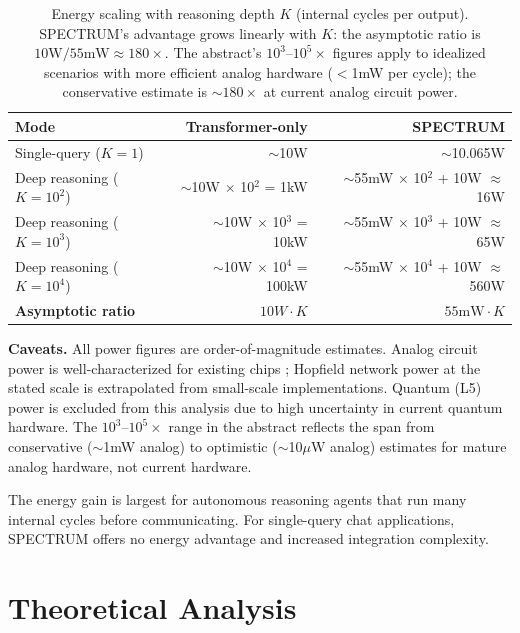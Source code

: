 \documentclass[12pt]{article}
\begin{document}
\begin{table}[H]
\centering
\small
\begin{tabular}{lrr}
\toprule
\textbf{Mode} & \textbf{Transformer-only} & \textbf{SPECTRUM} \\
\midrule
Single-query ($K=1$)     & $\sim$10W & $\sim$10.065W \\
Deep reasoning ($K=10^2$)  & $\sim$10W $\times$ 10$^2$ = 1kW & $\sim$55mW $\times$ 10$^2$ + 10W $\approx$ 16W \\
Deep reasoning ($K=10^3$)  & $\sim$10W $\times$ 10$^3$ = 10kW & $\sim$55mW $\times$ 10$^3$ + 10W $\approx$ 65W \\
Deep reasoning ($K=10^4$)  & $\sim$10W $\times$ 10$^4$ = 100kW & $\sim$55mW $\times$ 10$^4$ + 10W $\approx$ 560W \\
\textbf{Asymptotic ratio}  & $10W \cdot K$ & $55\text{mW} \cdot K$ \\
\bottomrule
\end{tabular}
\caption{Energy scaling with reasoning depth $K$ (internal cycles per output). SPECTRUM's advantage grows linearly with $K$: the asymptotic ratio is $10\text{W} / 55\text{mW} \approx 180\times$. The abstract's $10^3$--$10^5\times$ figures apply to idealized scenarios with more efficient analog hardware ($<$1mW per cycle); the conservative estimate is $\sim$$180\times$ at current analog circuit power.}
\label{tab:energy}
\end{table}

\textbf{Caveats.} All power figures are order-of-magnitude estimates. Analog circuit power is well-characterized for existing chips \cite{sarpeshkar2010}; Hopfield network power at the stated scale is extrapolated from small-scale implementations. Quantum (L5) power is excluded from this analysis due to high uncertainty in current quantum hardware. The $10^3$--$10^5\times$ range in the abstract reflects the span from conservative ($\sim$1mW analog) to optimistic ($\sim$10$\mu$W analog) estimates for mature analog hardware, not current hardware.

The energy gain is largest for autonomous reasoning agents that run many internal cycles before communicating. For single-query chat applications, SPECTRUM offers no energy advantage and increased integration complexity.

\section{Theoretical Analysis}
\label{sec:theory}
\end{document}

